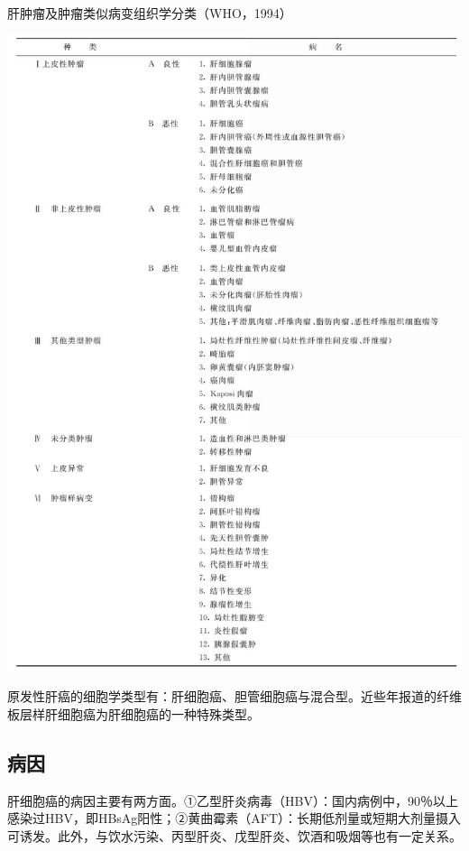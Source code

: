 \begin{table}[htbp]
\centering
\caption{肝肿瘤及肿瘤类似病变组织学分类（WHO，1994）}
\label{tab11-2}
\includegraphics[width=\textwidth,height=\textheight,keepaspectratio]{./images/Image00271.jpg}
\end{table}

原发性肝癌的细胞学类型有：肝细胞癌、胆管细胞癌与混合型。近些年报道的纤维板层样肝细胞癌为肝细胞癌的一种特殊类型。

\subsection{病因}

肝细胞癌的病因主要有两方面。①乙型肝炎病毒（HBV）：国内病例中，90％以上感染过HBV，即HBsAg阳性；②黄曲霉素（AFT）：长期低剂量或短期大剂量摄入可诱发。此外，与饮水污染、丙型肝炎、戊型肝炎、饮酒和吸烟等也有一定关系。

